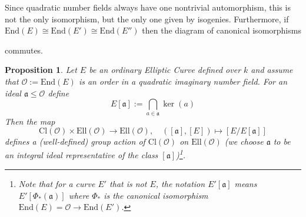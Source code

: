 \documentclass{scrartcl}
\newcommand{\End}{\mathrm{End}}
\newcommand{\Ell}{\mathrm{Ell}}
\newcommand{\Cl}{\mathrm{Cl}}
\newcommand{\Order}{\mathcal{O}}
\newtheorem{prop}{Proposition}[section]
\theoremstyle{definition}
\begin{document}
Since quadratic number fields always have one nontrivial automorphism, this is not the only isomorphism, but the only one given by isogenies.
Furthermore, if $\End(E) \cong \End(E') \cong \End(E'')$ then the diagram of canonical isomorphisms
\begin{center}
\end{center}
commutes.
\begin{prop}
    Let $E$ be an ordinary Elliptic Curve defined over $k$ and assume that $\Order := \End(E)$ is an order in a quadratic imaginary number field.
    For an ideal $\mathfrak{a} \leq \Order$ define
    \begin{equation*}
        E[\mathfrak{a}] := \bigcap_{a \in \mathfrak{a}} \ker(a)
    \end{equation*}
    Then the map
    \begin{equation*}
        \Cl(\Order) \times \Ell(\Order) \to \Ell(\Order), \quad ([\mathfrak{a}], [E]) \mapsto [E/E[\mathfrak{a}]]
    \end{equation*}
    defines a (well-defined) group action of $\Cl(\Order)$ on $\Ell(\Order)$ (we choose $\mathfrak{a}$ to be an integral ideal representative of the class $[\mathfrak{a}]$)\footnote{Note that for a curve $E'$ that is not $E$, the notation $E'[\mathfrak{a}]$ means $E'[\Phi_*(\mathfrak{a})]$ where $\Phi_*$ is the canonical isomorphism $\End(E) = \Order \to \End(E')$.}.
\end{prop}
\end{document}
